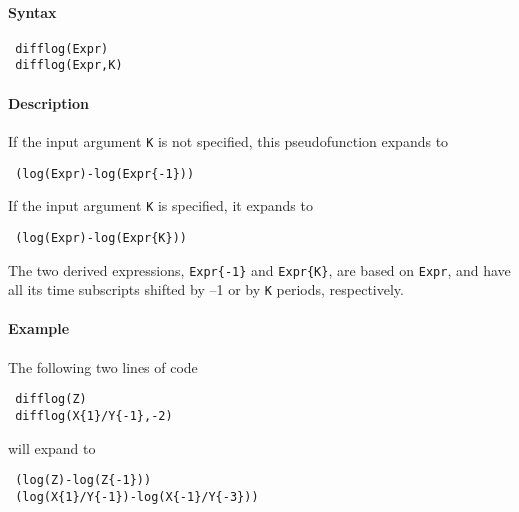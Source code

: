 


	\paragraph{Syntax}
 
 \begin{verbatim}
 difflog(Expr)
 difflog(Expr,K)
 \end{verbatim}
 
 \paragraph{Description}
 
 If the input argument \texttt{K} is not specified, this pseudofunction
 expands to
 
 \begin{verbatim}
 (log(Expr)-log(Expr{-1}))
 \end{verbatim}
 
 If the input argument \texttt{K} is specified, it expands to
 
 \begin{verbatim}
 (log(Expr)-log(Expr{K}))
 \end{verbatim}
 
 The two derived expressions, \texttt{Expr\{-1\}} and \texttt{Expr\{K\}},
 are based on \texttt{Expr}, and have all its time subscripts shifted by
 --1 or by \texttt{K} periods, respectively.
 
 \paragraph{Example}
 
 The following two lines of code
 
 \begin{verbatim}
 difflog(Z)
 difflog(X{1}/Y{-1},-2)
 \end{verbatim}
 
 will expand to
 
 \begin{verbatim}
 (log(Z)-log(Z{-1}))
 (log(X{1}/Y{-1})-log(X{-1}/Y{-3}))
 \end{verbatim}


